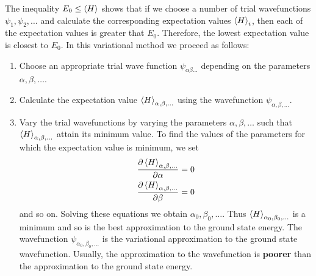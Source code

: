 	The inequality $E_0 \leq \expval{H}$ shows that if we choose a number of trial wavefunctions $\psi_1, \psi_2, \ldots$ and calculate the corresponding expectation values $\expval{H}_i$, then each of the expectation values is greater that $E_0$. Therefore, the lowest expectation value is closest to $E_0$. In this variational method we  proceed as follows:
	\begin{enumerate}
		\item 	Choose an appropriate trial wave function $\psi_{\alpha \beta \ldots}$ depending on the parameters $\alpha, \beta, \ldots$.
		
		
		\item Calculate the expectation value $\expval{H}_{\alpha, \beta, \ldots}$ using the wavefunction $\psi_{\alpha, \beta, \ldots}$.
		
		
		\item Vary the trial wavefunctions by varying the parameters $\alpha, \beta, \ldots$ such that $\expval{H}_{\alpha, \beta, \ldots}$ attain its minimum value. To find the values of the parameters for which the expectation value is minimum, we set
		\begin{align*}
			\pdv{\expval{H}_{\alpha, \beta, \ldots}}{\alpha} = 0\\
			\pdv{\expval{H}_{\alpha, \beta, \ldots}}{\beta} = 0
		\end{align*}
		and so on. Solving these equations we obtain $\alpha_0, \beta_0, \ldots$. Thus $\expval{H}_{\alpha_0, \beta_0, \ldots}$ is a minimum and so is the best approximation to the ground state energy. The wavefunction $\psi_{\alpha_0, \beta_0, \ldots}$ is the variational approximation to the ground state wavefunction. Usually, the approximation to the wavefunction is \textbf{poorer} than the approximation to the ground state energy.
	\end{enumerate}
	
	
